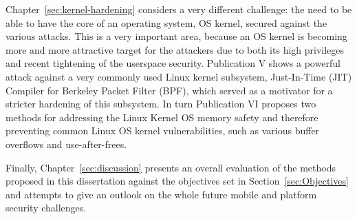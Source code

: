Chapter~\ref{sec:kernel-hardening} considers a very different challenge: the need to be able to have the core of an operating system, OS kernel, secured against the various attacks. This is a very important area, because an OS kernel is becoming more and more attractive target for the attackers due to both its high privileges and recent tightening of the userspace security. Publication V shows a powerful attack against a very commonly used Linux kernel subsystem, Just-In-Time (JIT) Compiler for Berkeley Packet Filter (BPF), which served as a motivator for a stricter hardening of this subsystem. In turn Publication VI proposes two methods for addressing the Linux Kernel OS memory safety and therefore preventing common Linux OS kernel vulnerabilities, such as various buffer overflows and use-after-frees. 

Finally, Chapter~\ref{sec:discussion} presents an overall evaluation of the methods proposed in this dissertation against the objectives set in Section~\ref{sec:Objectives} and attempts to give an outlook on the whole future mobile and platform security challenges. 

